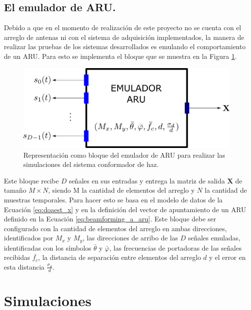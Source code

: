 \subsection{El emulador de ARU.}

Debido a que en el momento de realización de este proyecto no se cuenta con el arreglo de antenas ni con el sistema de adquisición implementados, la manera de realizar las pruebas de los sistemas desarrollados es emulando el comportamiento de un ARU. Para esto se implementa el bloque que se muestra en la Figura \ref{fig:gr_phasedarray}.

\begin{figure}[ht!]
    \centering
    \includegraphics[width=0.6\linewidth]{images/07-GNURadio/gr_phasedarray.png}
    \caption{Representación como bloque del emulador de ARU para realizar las simulaciones del sistema conformador de haz.}
    \label{fig:gr_phasedarray}
\end{figure}

Este bloque recibe $D$ señales en sus entradas y entrega la matriz de salida $\mathbf{X}$ de tamaño $M\times N$, siendo M la cantidad de elementos del arreglo y $N$ la cantidad de muestras temporales. Para hacer esto se basa en el modelo de datos de la Ecuación \ref{eq:doaest_x} y en la definición del vector de apuntamiento de un ARU definido en la Ecuación \ref{eq:beamforming_a_aru}. Este bloque debe ser configurado con la cantidad de elementos del arreglo en ambas direcciones, identificados por $M_x$ y $M_y$, las direcciones de arribo de las $D$ señales emuladas, identificadas con los símbolos $\bar{\theta}$ y $\bar{\varphi}$, las frecuencias de portadoras de las señales recibidas $\bar{f_c}$, la distancia de separación entre elementos del arreglo $d$ y el error en esta distancia $\frac{\sigma_d}{d}$.

\section{Simulaciones}\label{subc:gr_simulaciones}

